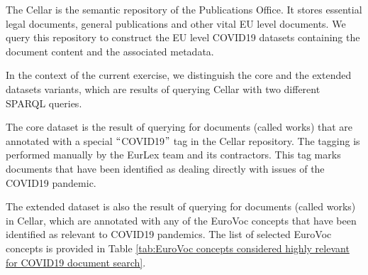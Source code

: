 The Cellar is the semantic repository of the Publications Office. It stores essential legal documents, general publications and other vital EU level documents. We query this repository to construct the EU level COVID19 datasets containing the document content and the associated metadata. 

In the context of the current exercise, we distinguish the core and the extended datasets variants, which are results of querying Cellar with two different SPARQL queries.

The core dataset is the result of querying for documents (called works) that are annotated with a special $``$COVID19$"$  tag in the Cellar repository. The tagging is performed manually by the EurLex team and its contractors. This tag marks documents that have been identified as dealing directly with issues of the COVID19 pandemic. 

The extended dataset is also the result of querying for documents (called works) in Cellar, which are annotated with any of the EuroVoc concepts that have been identified as relevant to COVID19 pandemics. The list of selected EuroVoc concepts is provided in  Table \ref{tab:EuroVoc concepts considered highly relevant for COVID19 document search}. 

